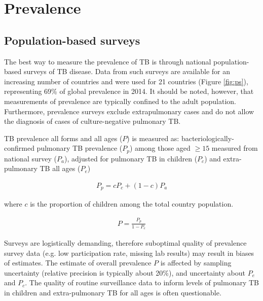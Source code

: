 \section{Prevalence}

\subsection{Population-based surveys}
The best way to measure the prevalence of TB is through national population-based surveys of TB disease\cite{18713496}\cite{WHO2011}. Data from such surveys are available for an increasing number of countries and were used for 21 countries (Figure \ref{fig:ps}), representing 69\% of global prevalence in 2014. It should be noted, however, that measurements of prevalence are typically confined to the adult population. Furthermore, prevalence surveys exclude extrapulmonary cases and do not allow the diagnosis of cases of culture-negative pulmonary TB. 

TB prevalence all forms and all ages ($P$) is measured as:  bacteriologically-confirmed pulmonary TB prevalence ($P_{p}$) among those aged $\geq 15$ measured from national survey ($P_{a}$), adjusted for pulmonary TB in children ($P_{c}$) and extra-pulmonary TB all ages ($P_{e}$)

\begin{align*}
P_{p} = c P_{c} + (1 − c) P_{a}
\end{align*}

where $c$ is the proportion of children among the total country population.

\begin{align*}
P = \frac{P_{p}}{1 - P_{e}}
\end{align*}

Surveys are logistically demanding, therefore suboptimal quality of prevalence survey data (e.g. low participation rate, missing lab results) may result in biases of estimates. The estimate of overall prevalence $P$ is affected by sampling uncertainty (relative precision is typically about 20\%), and uncertainty about $P_{e}$ and $P_{c}$. The  quality of routine surveillance data to inform levels of pulmonary TB in children and extra-pulmonary TB for all ages is often questionable.



 